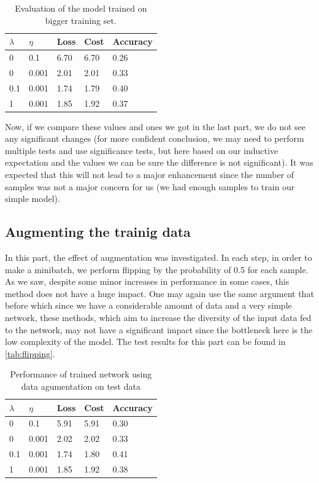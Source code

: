\documentclass[a4paper]{article}
\begin{document}
\begin{table}[h]
	\centering
	\caption{Evaluation of the model trained on bigger training set.}
	\label{tab:bigger_training}
	\begin{tabular}{|l|l|l|l|l|}
		\hline
		$\lambda$ & $\eta$ & Loss & Cost & Accuracy \\ \hline
		0         & 0.1    & 6.70 & 6.70 & 0.26     \\ \hline
		0         & 0.001  & 2.01 & 2.01 & 0.33     \\ \hline
		0.1       & 0.001  & 1.74 & 1.79 & 0.40     \\ \hline
		1         & 0.001  & 1.85 & 1.92 & 0.37     \\ \hline
	\end{tabular}
\end{table}

Now, if we compare these values and ones we got in the last part, we do not see any significant changes (for more confident conclusion, we may need to perform multiple tests and use significance tests, but here based on our inductive expectation and the values we can be sure the difference is not significant). It was expected that this will not lead to a major enhancement since the number of samples was not a major concern for us (we had enough samples to train our simple model).

\subsection*{Augmenting the trainig data}

In this part, the effect of augmentation was investigated. In each step, in order to make a minibatch, we perform flipping by the probability of 0.5 for each sample. As we saw, despite some minor increases in performance in some cases, this method does not have a huge impact. One may again use the same argument that before which since we have a considerable amount of data and a very simple network, these methods, which aim to increase the diversity of the input data fed to the network, may not have a significant impact since the bottleneck here is the low complexity of the model. The test results for this part can be found in \autoref{tab:flipping}.

\begin{table}[h]
	\centering
	\caption{Performance of trained network using data agumentation on test data}
	\label{tab:flipping}
	\begin{tabular}{|l|l|l|l|l|}
		\hline
		$\lambda$ & $\eta$ & Loss & Cost & Accuracy \\ \hline
		0         & 0.1    & 5.91 & 5.91 & 0.30     \\ \hline
		0         & 0.001  & 2.02 & 2.02 & 0.33     \\ \hline
		0.1       & 0.001  & 1.74 & 1.80 & 0.41     \\ \hline
		1         & 0.001  & 1.85 & 1.92 & 0.38     \\ \hline
	\end{tabular}
\end{table}
\end{document}
